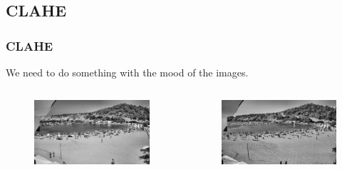 \documentclass{beamer}
\begin{document}
\subsection*{CLAHE}
    \begin{frame}
        \frametitle{CLAHE}
        We need to do something with the mood of the images.
        \begin{columns}[c]
                \begin{column}{.5\textwidth}
                \begin{figure}
                    \centering
                    \includegraphics[width=\textwidth]{../gen/equ/1660298400.jpg}
                    
                \end{figure}      
                \end{column}
                \begin{column}{.5\textwidth}
                \begin{figure}
                    \centering
                    \includegraphics[width=\textwidth]{../gen/equ/1660316400.jpg}                 
                \end{figure}
                \end{column}
            \end{columns}

    \end{frame}
\end{document}
